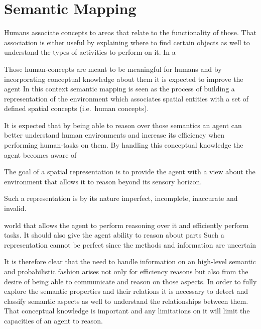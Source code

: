 \chapter{Semantic Mapping}\label{chap:semantic-mapping}

Humans associate concepts to areas that relate to the functionality of those. That
association is either useful by explaining where to find certain objects as well to
understand the types of activities to perform on it. In a 

Those human-concepts are meant to be meaningful for humans and by incorporating conceptual
knowledge about them it is expected to improve the agent 
In this context semantic mapping is seen as the process of building a representation of
the environment which associates spatial entities with a set of defined spatial concepts (i.e.\ human concepts).

It is expected that by being able to reason over those semantics an agent can better
understand human environments and increase its efficiency when performing human-tasks on them.
By handling this conceptual knowledge the agent becomes aware of 


The goal of a spatial representation is to provide the agent with a view about the environment
that allows it to reason beyond its sensory horizon.

 Such a representation is by its nature
imperfect, incomplete, inaccurate and invalid.

world that allows the agent to perform reasoning over it and efficiently perform tasks.
It should also give the agent ability to reason about parts 
Such a representation cannot be perfect since the methods and information are uncertain




It is therefore clear that the need to handle information on an high-level semantic and
probabilistic fashion arises not only for efficiency reasons but also from the desire
of being able to communicate and reason on those aspects.
In order to fully explore the semantic properties and their relations it is necessary to
detect and classify semantic aspects as well to understand the relationships between them.
That conceptual knowledge is important and any limitations on it will limit the capacities
of an agent to reason. 

